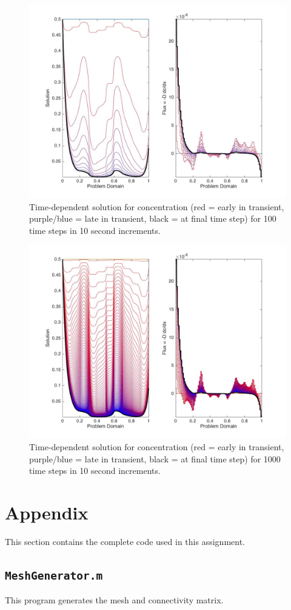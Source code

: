 \documentclass[10pt]{article}
\begin{document}
\begin{figure}[H]
  \centering
  \includegraphics[width=16cm]{100.jpg}
  \caption{Time-dependent solution for concentration (red = early in transient, purple/blue = late in transient, black = at final time step) for 100 time steps in 10 second increments.}
\end{figure}

\begin{figure}[H]
  \centering
  \includegraphics[width=16cm]{1000.jpg}
  \caption{Time-dependent solution for concentration (red = early in transient, purple/blue = late in transient, black = at final time step) for 1000 time steps in 10 second increments.}
\end{figure}

\section{Appendix}

This section contains the complete code used in this assignment. 

\subsection{\texttt{MeshGenerator.m}}
This program generates the mesh and connectivity matrix.

\end{document}
